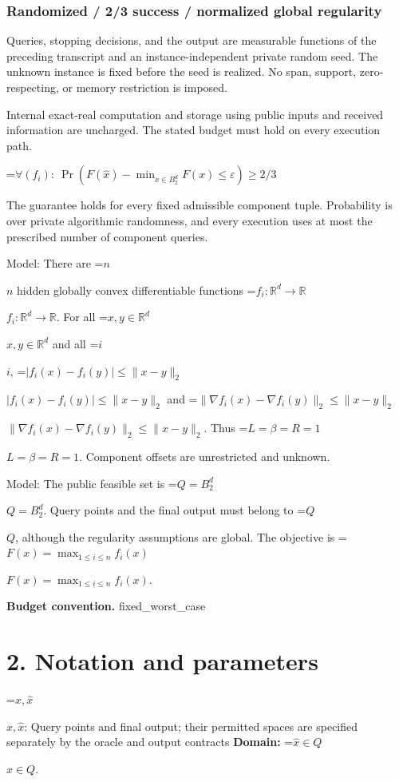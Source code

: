 \documentclass[10pt,a4paper]{article}
\newcommand{\AtlasMath}[1]{\par\begingroup\centering\setbox0=\hbox{$\displaystyle #1$}\ifdim\wd0>1.4\linewidth\typeout{ATLAS WIDE FORMULA: \the\wd0}\fi\ifdim\wd0>\linewidth\resizebox{\linewidth}{!}{\box0}\else\box0\fi\par\endgroup}
\newcommand{\AtlasInlineMath}[1]{\begingroup\setbox0=\hbox{$#1$}\ifdim\wd0>.4\linewidth\endgroup\AtlasMath{#1}\else\endgroup$#1$\fi}
\begin{document}
\subsubsection{Randomized / 2/3 success / normalized global regularity}


Queries, stopping decisions, and the output are measurable functions of the preceding transcript and an instance-independent private random seed. The unknown instance is fixed before the seed is realized. No span, support, zero-respecting, or memory restriction is imposed.



Internal exact-real computation and storage using public inputs and received information are uncharged. The stated budget must hold on every execution path.




\AtlasMath{\forall(f_i):\ \Pr(F(\widehat x)-\min_{x\in B_2^d}F(x)\le\varepsilon)\ge2/3}




The guarantee holds for every fixed admissible component tuple. Probability is over private algorithmic randomness, and every execution uses at most the prescribed number of component queries.



Model: There are \AtlasInlineMath{n} hidden globally convex differentiable functions \AtlasInlineMath{f_i:\mathbb R^d\to\mathbb R}. For all \AtlasInlineMath{x,y\in\mathbb R^d} and all \AtlasInlineMath{i}, \AtlasInlineMath{|f_i(x)-f_i(y)|\le\|x-y\|_2} and \AtlasInlineMath{\|\nabla f_i(x)-\nabla f_i(y)\|_2\le\|x-y\|_2}. Thus \AtlasInlineMath{L=\beta=R=1}. Component offsets are unrestricted and unknown.



Model: The public feasible set is \AtlasInlineMath{Q=B_2^d}. Query points and the final output must belong to \AtlasInlineMath{Q}, although the regularity assumptions are global. The objective is \AtlasInlineMath{F(x)=\max_{1\le i\le n}f_i(x)}.



\textbf{Budget convention.} fixed\_worst\_case



\section{2. Notation and parameters}


\AtlasInlineMath{x,\widehat{x}}: Query points and final output; their permitted spaces are specified separately by the oracle and output contracts \textbf{Domain:} \AtlasInlineMath{\widehat{x}\in Q}.
\end{document}
